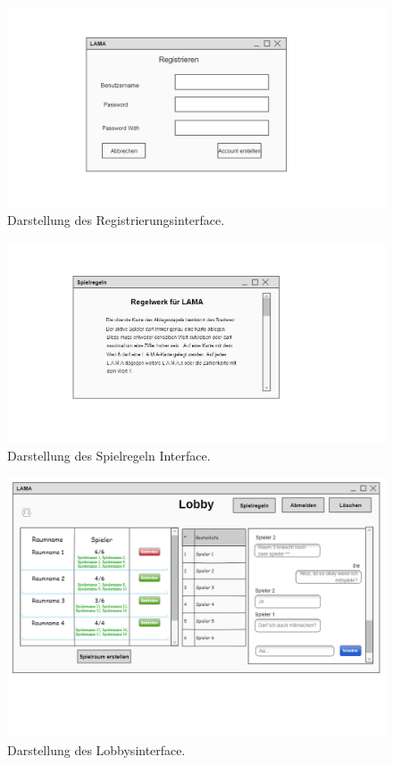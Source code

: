 \begin{figure}[h]
	\centering
	\includegraphics[width=\textwidth]{img/registrierungsinterface.png}
	\caption{Darstellung des Registrierungsinterface.}
	\label{gui:register}
\end{figure}

\begin{figure}[h]
	\centering
	\includegraphics[width=\textwidth]{img/spielregeln.png}
	\caption{Darstellung des Spielregeln Interface.}
	\label{gui:spielregeln} %
\end{figure}

\begin{figure}[h]
	\centering
	\includegraphics[width=\textwidth]{img/lobby.png}
	\caption{Darstellung des Lobbysinterface.}
	\label{gui:lobby} %
\end{figure}

